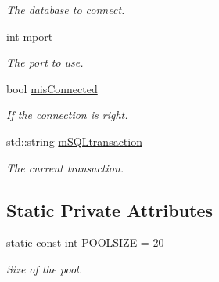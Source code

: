\begin{DoxyCompactItemize}
\begin{DoxyCompactList}\small\item\em The database to connect. \item\end{DoxyCompactList}\item 
\hypertarget{classPOSTGREDatabase_a6d90a3e1956edf536d26453a0656669f}{
int \hyperlink{classPOSTGREDatabase_a6d90a3e1956edf536d26453a0656669f}{mport}}
\label{classPOSTGREDatabase_a6d90a3e1956edf536d26453a0656669f}

\begin{DoxyCompactList}\small\item\em The port to use. \item\end{DoxyCompactList}\item 
\hypertarget{classPOSTGREDatabase_aa4f59d325b41b9b328878323c9589ac4}{
bool \hyperlink{classPOSTGREDatabase_aa4f59d325b41b9b328878323c9589ac4}{misConnected}}
\label{classPOSTGREDatabase_aa4f59d325b41b9b328878323c9589ac4}

\begin{DoxyCompactList}\small\item\em If the connection is right. \item\end{DoxyCompactList}\item 
\hypertarget{classPOSTGREDatabase_a8be0fe1af42ae6713524210d5e623a3a}{
std::string \hyperlink{classPOSTGREDatabase_a8be0fe1af42ae6713524210d5e623a3a}{mSQLtransaction}}
\label{classPOSTGREDatabase_a8be0fe1af42ae6713524210d5e623a3a}

\begin{DoxyCompactList}\small\item\em The current transaction. \item\end{DoxyCompactList}\end{DoxyCompactItemize}
\subsection*{Static Private Attributes}
\begin{DoxyCompactItemize}
\item 
\hypertarget{classPOSTGREDatabase_a9e7541e24b03ddcf15554e6a359fab2f}{
static const int \hyperlink{classPOSTGREDatabase_a9e7541e24b03ddcf15554e6a359fab2f}{POOLSIZE} = 20}
\label{classPOSTGREDatabase_a9e7541e24b03ddcf15554e6a359fab2f}

\begin{DoxyCompactList}\small\item\em Size of the pool. \item\end{DoxyCompactList}\end{DoxyCompactItemize}


